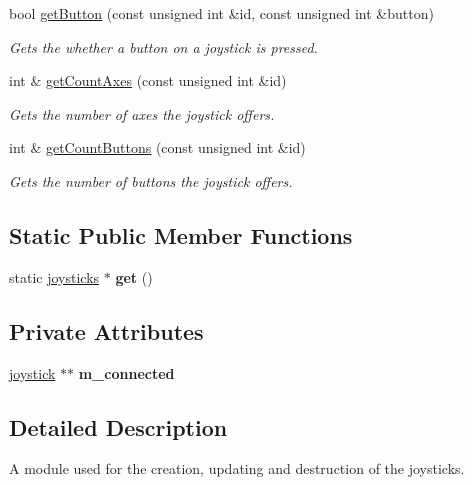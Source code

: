 \begin{DoxyCompactItemize}
bool \hyperlink{classflounder_1_1joysticks_a297e86b7a762f260732f45aa4ae18c9e}{get\+Button} (const unsigned int \&id, const unsigned int \&button)
\begin{DoxyCompactList}\small\item\em Gets the whether a button on a joystick is pressed. \end{DoxyCompactList}\item 
int \& \hyperlink{classflounder_1_1joysticks_ac8353f4ea09b68f6d363dc1388bfa691}{get\+Count\+Axes} (const unsigned int \&id)
\begin{DoxyCompactList}\small\item\em Gets the number of axes the joystick offers. \end{DoxyCompactList}\item 
int \& \hyperlink{classflounder_1_1joysticks_af66c613d9ffcebd1ab2f799b77fe1fb2}{get\+Count\+Buttons} (const unsigned int \&id)
\begin{DoxyCompactList}\small\item\em Gets the number of buttons the joystick offers. \end{DoxyCompactList}\end{DoxyCompactItemize}
\subsection*{Static Public Member Functions}
\begin{DoxyCompactItemize}
\item 
\mbox{\label{classflounder_1_1joysticks_a2c47c69053bf582ee6eb22d135d71084}} 
static \hyperlink{classflounder_1_1joysticks}{joysticks} $\ast$ {\bfseries get} ()
\end{DoxyCompactItemize}
\subsection*{Private Attributes}
\begin{DoxyCompactItemize}
\item 
\mbox{\label{classflounder_1_1joysticks_a9000954268ff0dc151b34904514e2942}} 
\hyperlink{structflounder_1_1joysticks_1_1joystick}{joystick} $\ast$$\ast$ {\bfseries m\+\_\+connected}
\end{DoxyCompactItemize}


\subsection{Detailed Description}
A module used for the creation, updating and destruction of the joysticks. 



